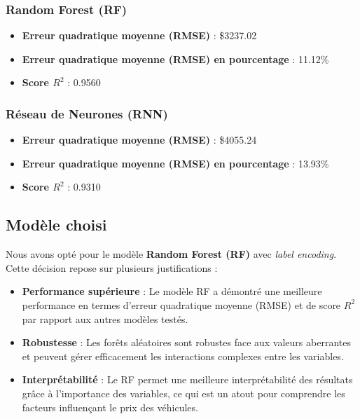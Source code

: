 \documentclass[12pt]{report}
\begin{document}
\subsubsection{Random Forest (RF)}

\begin{itemize}
    \item \textbf{Erreur quadratique moyenne (RMSE)} : \$3237.02
    \item \textbf{Erreur quadratique moyenne (RMSE) en pourcentage} : 11.12\%
    \item \textbf{Score \( R^2 \)} : 0.9560
\end{itemize}

\subsubsection{Réseau de Neurones (RNN)}

\begin{itemize}
    \item \textbf{Erreur quadratique moyenne (RMSE)} : \$4055.24
    \item \textbf{Erreur quadratique moyenne (RMSE) en pourcentage} : 13.93\%
    \item \textbf{Score \( R^2 \)} : 0.9310
\end{itemize}

\subsection{Modèle choisi}

Nous avons opté pour le modèle \textbf{Random Forest (RF)} avec \textit{label encoding}. Cette décision repose sur plusieurs justifications :

\begin{itemize}
    \item \textbf{Performance supérieure} : Le modèle RF a démontré une meilleure performance en termes d'erreur quadratique moyenne (RMSE) et de score \( R^2 \) par rapport aux autres modèles testés.
    \item \textbf{Robustesse} : Les forêts aléatoires sont robustes face aux valeurs aberrantes et peuvent gérer efficacement les interactions complexes entre les variables.
    \item \textbf{Interprétabilité} : Le RF permet une meilleure interprétabilité des résultats grâce à l'importance des variables, ce qui est un atout pour comprendre les facteurs influençant le prix des véhicules.
\end{itemize}
\end{document}
